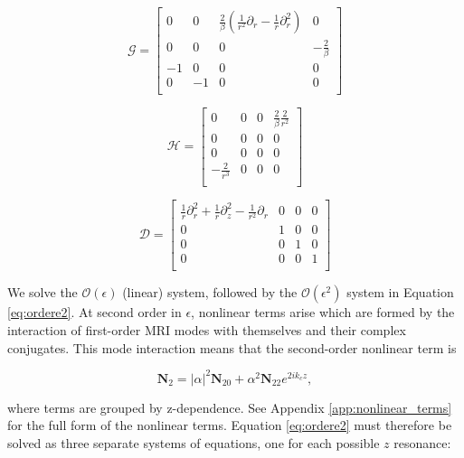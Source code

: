 \documentclass{emulateapj}
\newcommand{\beq}{\begin{equation}}
\newcommand{\eeq}{\end{equation}}
\begin{document}
\beq
\mathcal{G} = \left[\begin{matrix}
0 & 0 & \frac{2}{\beta}(\frac{1}{r^2}\partial_r - \frac{1}{r}\partial_r^2) & 0 \\
0 & 0 & 0 & -\frac{2}{\beta} \\
-1 & 0 & 0 & 0 \\
0 & -1 & 0 & 0 \\
\end{matrix}\right]
\eeq

\beq
\mathcal{H} = \left[\begin{matrix}
0 & 0 & 0 & \frac{2}{\beta} \frac{2}{r^2} \\
0 & 0 & 0 & 0 \\
0 & 0 & 0 & 0 \\
-\frac{2}{r^3} & 0 & 0 & 0 \\
\end{matrix}\right]
\eeq

\beq
\mathcal{D} = \left[\begin{matrix}
\frac{1}{r}\partial_r^2 + \frac{1}{r}\partial_z^2 - \frac{1}{r^2}\partial_r & 0 & 0 & 0 \\
0 & 1 & 0 & 0 \\
0 & 0 & 1 & 0 \\
0 & 0 & 0 & 1 \\
\end{matrix}\right]
\eeq

We solve the $\mathcal{O}(\epsilon)$ (linear) system, followed by the $\mathcal{O}(\epsilon^2)$ system in Equation \ref{eq:ordere2}. At second order in $\epsilon$, nonlinear terms arise which are formed by the interaction of first-order MRI modes with themselves and their complex conjugates. This mode interaction means that the second-order nonlinear term is 

\beq
\mathbf{N}_2 = |\alpha|^2 \mathbf{N}_{20} + \alpha^2 \mathbf{N}_{22} e^{2 i k_c z},
\eeq

where terms are grouped by z-dependence. See Appendix \ref{app:nonlinear_terms} for the full form of the nonlinear terms. Equation \ref{eq:ordere2} must therefore be solved as three separate systems of equations, one for each possible $z$ resonance: 
\end{document}
